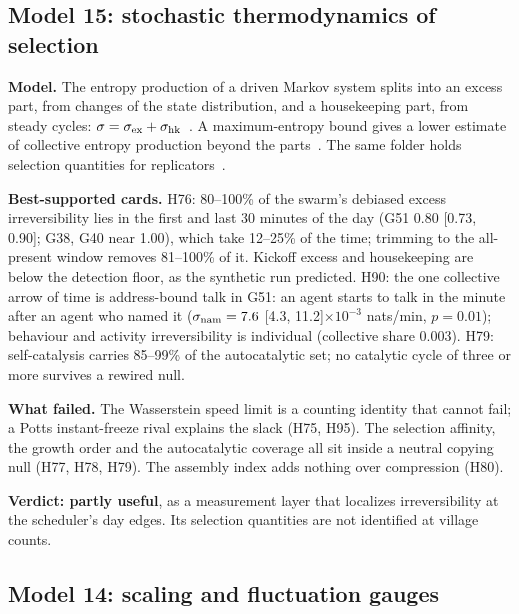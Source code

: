 \subsection{Model 15: stochastic thermodynamics of selection}\label{sec:m15}

\textbf{Model.} The entropy production of a driven Markov system splits into an excess part, from changes of the state distribution, and a housekeeping part, from steady cycles: $\sigma=\sigma_{\rm ex}+\sigma_{\rm hk}$~\cite{kolchinsky2026}. A maximum-entropy bound gives a lower estimate of collective entropy production beyond the parts~\cite{aguilera2026}. The same folder holds selection quantities for replicators~\cite{kolchinsky2025}.

\textbf{Best-supported cards.} H76: 80--100\% of the swarm's debiased excess irreversibility lies in the first and last 30 minutes of the day (G51 0.80 [0.73, 0.90]; G38, G40 near 1.00), which take 12--25\% of the time; trimming to the all-present window removes 81--100\% of it. Kickoff excess and housekeeping are below the detection floor, as the synthetic run predicted. H90: the one collective arrow of time is address-bound talk in G51: an agent starts to talk in the minute after an agent who named it ($\sigma_{\rm nam}=7.6$ [4.3, 11.2]$\times10^{-3}$ nats/min, $p=0.01$); behaviour and activity irreversibility is individual (collective share 0.003). H79: self-catalysis carries 85--99\% of the autocatalytic set; no catalytic cycle of three or more survives a rewired null.

\textbf{What failed.} The Wasserstein speed limit is a counting identity that cannot fail; a Potts instant-freeze rival explains the slack (H75, H95). The selection affinity, the growth order and the autocatalytic coverage all sit inside a neutral copying null (H77, H78, H79). The assembly index adds nothing over compression (H80).

\textbf{Verdict: partly useful}, as a measurement layer that localizes irreversibility at the scheduler's day edges. Its selection quantities are not identified at village counts.

\subsection{Model 14: scaling and fluctuation gauges}\label{sec:m14}

